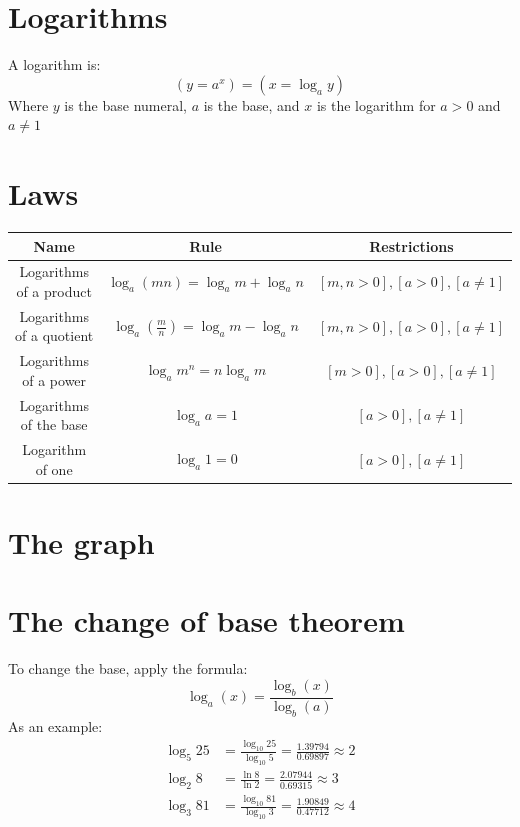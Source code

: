 \documentclass{book}
\begin{document}
\chapter{Logarithms}
A logarithm is:
\[
	(y = a^x) = (x = \log_ay)
\]
Where $y$ is the base numeral, $a$ is the base, and $x$ is the logarithm for $a > 0$ and $a \not = 1$

\chapter{Laws}
\begin{center}
	\begin{tabular}{c|c|c}
		Name                     & Rule                                      & Restrictions                        \\ \hline
		Logarithms of a product  & $\log_a(mn) = \log_am + \log_an$          & $[m, n > 0], [a > 0], [a \not = 1]$ \\
		Logarithms of a quotient & $\log_a(\frac{m}{n}) = \log_am - \log_an$ & $[m, n > 0], [a > 0], [a \not = 1]$ \\
		Logarithms of a power    & $\log_am^n = n\log_am$                    & $[m > 0], [a > 0], [a \not = 1]$    \\
		Logarithms of the base   & $\log_aa = 1$                             & $[a > 0], [a \not = 1]$             \\
		Logarithm of one         & $\log_a 1 = 0$                            & $[a > 0], [a \not = 1]$
	\end{tabular}
\end{center}

\chapter{The graph}
\begin{center}
\end{center}

\chapter{The change of base theorem}
To change the base, apply the formula:
\[
	\log_{a}{(x)} = \frac{\log_{b}{(x)}}{\log_{b}{(a)}}
\]
As an example:
\begin{align*}
	\log_{5}25 & = \frac{\log_{10}25}{\log_{10}5} = \frac{1.39794}{0.69897} \approx 2 \\
	\log_{2}8  & = \frac{\ln 8}{\ln 2} = \frac{2.07944}{0.69315} \approx 3            \\
	\log_{3}81 & = \frac{\log_{10}81}{\log_{10}3} = \frac{1.90849}{0.47712} \approx 4
\end{align*}
\end{document}
